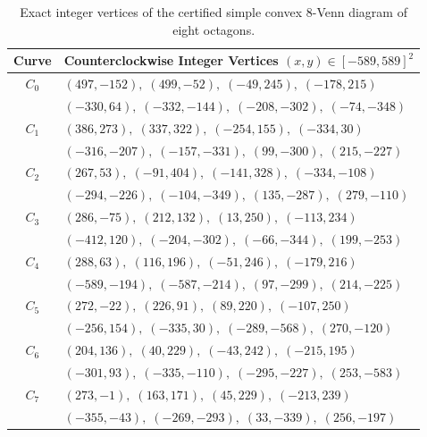 \documentclass[11pt]{article}
\begin{document}
\begin{table}[h]
\centering
\footnotesize
\begin{tabular}{@{}cl@{}}
\toprule
Curve & Counterclockwise Integer Vertices $(x,y) \in [-589, 589]^2$ \\
\midrule
$C_0$ & $(497,-152),\; (499,-52),\; (-49,245),\; (-178,215)$ \\
        & $(-330,64),\; (-332,-144),\; (-208,-302),\; (-74,-348)$ \\[2pt]
$C_1$ & $(386,273),\; (337,322),\; (-254,155),\; (-334,30)$ \\
        & $(-316,-207),\; (-157,-331),\; (99,-300),\; (215,-227)$ \\[2pt]
$C_2$ & $(267,53),\; (-91,404),\; (-141,328),\; (-334,-108)$ \\
        & $(-294,-226),\; (-104,-349),\; (135,-287),\; (279,-110)$ \\[2pt]
$C_3$ & $(286,-75),\; (212,132),\; (13,250),\; (-113,234)$ \\
        & $(-412,120),\; (-204,-302),\; (-66,-344),\; (199,-253)$ \\[2pt]
$C_4$ & $(288,63),\; (116,196),\; (-51,246),\; (-179,216)$ \\
        & $(-589,-194),\; (-587,-214),\; (97,-299),\; (214,-225)$ \\[2pt]
$C_5$ & $(272,-22),\; (226,91),\; (89,220),\; (-107,250)$ \\
        & $(-256,154),\; (-335,30),\; (-289,-568),\; (270,-120)$ \\[2pt]
$C_6$ & $(204,136),\; (40,229),\; (-43,242),\; (-215,195)$ \\
        & $(-301,93),\; (-335,-110),\; (-295,-227),\; (253,-583)$ \\[2pt]
$C_7$ & $(273,-1),\; (163,171),\; (45,229),\; (-213,239)$ \\
        & $(-355,-43),\; (-269,-293),\; (33,-339),\; (256,-197)$ \\[2pt]
\bottomrule
\end{tabular}
\caption{Exact integer vertices of the certified simple convex $8$-Venn diagram of eight octagons.}
\label{tab:coords8}
\end{table}
\end{document}
